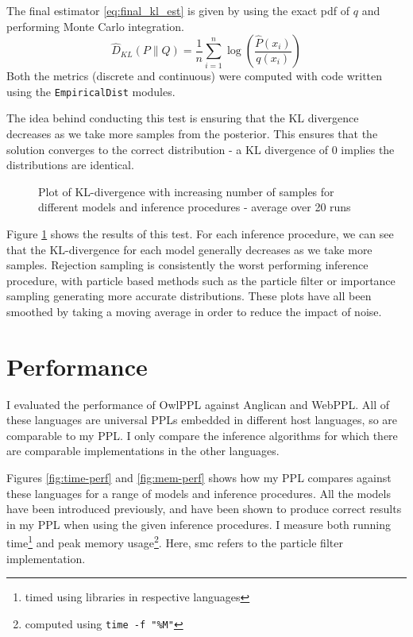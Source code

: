 % 
The final estimator \eqref{eq:final_kl_est} is given by using the exact pdf of $q$ and performing Monte Carlo integration.
% 
\begin{equation}
	\label{eq:final_kl_est}
	\hat{D}_{KL}(P \| Q) = \frac1{n}\sum_{i=1}^n \log\left(\frac{\hat{P}(x_i)}{q(x_i)}\right) 
\end{equation}
% 
Both the metrics (discrete and continuous) were computed with code written using the \texttt{EmpiricalDist} modules.
						
The idea behind conducting this test is ensuring that the KL divergence decreases as we take more samples from the posterior. This ensures that the solution converges to the correct distribution - a KL divergence of 0 implies the distributions are identical. 
						
\begin{figure}[H]
	\centering
	
	\caption{Plot of KL-divergence with increasing number of samples for different models and inference procedures - average over 20 runs}
	\label{fig:kl}
\end{figure}
						
Figure \ref{fig:kl} shows the results of this test. For each inference procedure, we can see that the KL-divergence for each model generally decreases as we take more samples. Rejection sampling is consistently the worst performing inference procedure, with particle based methods such as the particle filter or importance sampling generating more accurate distributions. These plots have all been smoothed by taking a moving average in order to reduce the impact of noise.
						
						
						
\section{Performance}
						
I evaluated the performance of OwlPPL against Anglican and WebPPL. All of these languages are universal PPLs embedded in different host languages, so are comparable to my PPL. I only compare the inference algorithms for which there are comparable implementations in the other languages.
						
Figures \ref{fig:time-perf} and \ref{fig:mem-perf} shows how my PPL compares against these languages for a range of models and inference procedures. All the models have been introduced previously, and have been shown to produce correct results in my PPL when using the given inference procedures. I measure both running time\footnote{timed using libraries in respective languages} and peak memory usage\footnote{computed using \texttt{time -f "\%M"}}. Here, smc refers to the particle filter implementation.
						
